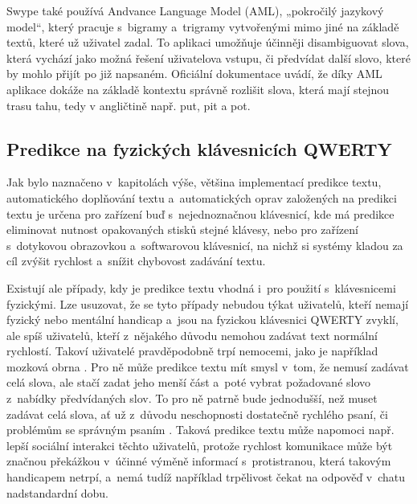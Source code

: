 \documentclass[a4paper,11pt,openany]{book} %
\newcommand\exmp{\textsf}
\begin{document}

Swype také používá Andvance Language Model (AML), „pokročilý jazykový model“, který pracuje s~bigramy a~trigramy vytvořenými mimo jiné na základě textů, které už uživatel zadal. To aplikaci umožňuje účinněji disambiguovat slova, která vychází jako možná řešení uživatelova vstupu, či předvídat další slovo, které by mohlo přijít po již napsaném. Oficiální dokumentace uvádí, že díky AML aplikace dokáže na základě kontextu správně rozlišit slova, která mají stejnou trasu tahu, tedy v angličtině např. \exmp{put}, \exmp{pit} a \exmp{pot}. \parencite{swypehowto}

\subsection{Predikce na fyzických klávesnicích QWERTY}

Jak bylo naznačeno v~kapitolách výše, většina implementací predikce textu, automatického doplňování textu a~automatických oprav založených na predikci textu je určena pro zařízení buď s~nejednoznačnou klávesnicí, kde má predikce eliminovat nutnost opakovaných stisků stejné klávesy, nebo pro zařízení s~dotykovou obrazovkou a~softwarovou klávesnicí, na nichž si systémy kladou za cíl zvýšit rychlost a~snížit chybovost zadávání textu. 

Existují ale případy, kdy je predikce textu vhodná i~pro použití s~klávesnicemi fyzickými. Lze usuzovat, že se tyto případy nebudou týkat uživatelů, kteří nemají fyzický nebo mentální handicap a~jsou na fyzickou klávesnici QWERTY zvyklí, ale spíš uživatelů, kteří z~nějakého důvodu nemohou zadávat text normální rychlostí. Takoví uživatelé pravděpodobně trpí nemocemi, jako je například mozková obrna \parencite[1--]{philgadomski}. Pro ně může predikce textu mít smysl v~tom, že nemusí zadávat celá slova, ale stačí zadat jeho menší část a~poté vybrat požadované slovo z~nabídky předvídaných slov. To pro ně patrně bude jednodušší, než muset zadávat celá slova, ať už z~důvodu neschopnosti dostatečně rychlého psaní, či problémům se správným psaním \parencite{penfriend2014}. %
Taková predikce textu může napomoci např. lepší sociální interakci těchto uživatelů, protože rychlost komunikace může být značnou překážkou v~účinné výměně informací s~protistranou, která takovým handicapem netrpí, a~nemá tudíž například trpělivost čekat na odpověď v~chatu nadstandardní dobu. %
\end{document}
